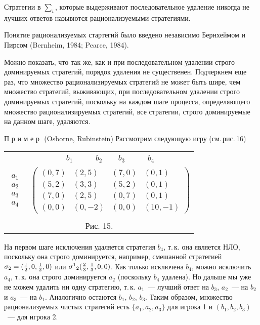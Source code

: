 \begin{definition}
Стратегии в $\sum_i$, которые выдерживают последовательное удаление
никогда не лучших ответов назывются рационализуемыми стратегиями.
\end{definition}

Понятие рационализуемых стартегий было введено независимо Бернхеймом
и Пирсом (Bernheim, 1984; Pearce, 1984).

Можно показать, что так же, как и при последовательном удалении
строго доминируемых стратегий, порядок удаления не существенен.
Подчеркнем еще раз, что множество рационализируемых стратегий не
может быть шире, чем множество стратегий, выживающих, при
последовательном удалении строго доминируемых стратегий, поскольку
на каждом шаге процесса, определяющего множество рационализируемых
стратегий, все стратегии, строго доминируемые на данном шаге,
удаляются.

П р и м е р\,\, (Osborne, Rubinstein) Рассмотрим следующую игру
(см.\,рис.\,16)

\begin{center}
\begin{tabular}{cc}
&$\begin{array}{cccc} b_1\qquad& b_2\quad\,& b_3&\qquad b_4 \end{array}$\\
$\begin{array}{c} a_1\\ a_2\\ a_3\\ a_4 \end{array}$&
$\left(\begin{array}{cccc} (0,7)&(2,5)&(7,0)&(0,1)\\
(5,2)&(3,3)&(5,2)&(0,1)\\
(7,0)&(2,5)&(0,7)&(0,1)\\
(0,0)&(0,-2)&(0,0)&(10,-1)\end{array}\right)$\\
\multicolumn{2}{c}{}\\
\multicolumn{2}{c}{Рис. 15.}\\
\end{tabular}
\end{center}

На первом шаге исключения удаляется стратегия $b_4$, т.\,к. она
является НЛО, поскольку она строго доминируется, например, смешанной
стратегией $\sigma_2=({1\over 2},0,{1\over 2},0)$ или
${\sigma^1}_2({2\over 3},{1\over 3},0,0)$. Как только исключена
$b_4$, можно исключить $a_4$, т.\,к. она строго доминируется $a_2$
(поскольку $b_4$ удалена). Но дальше мы уже не можем удалить ни одну
стратегию, т.\,к. $a_1$~--- лучший ответ на $b_3$, $a_2$~--- на
$b_2$ и $a_3$~--- на  $b_1$. Аналогично остаются $b_1$, $b_2$,
$b_3$. Таким образом, множество рационализуемых чистых стратегий
есть $\{a_1,a_2,a_3\}$ для игрока 1 и $(b_1,b_2,b_3)$~--- для игрока
2.


